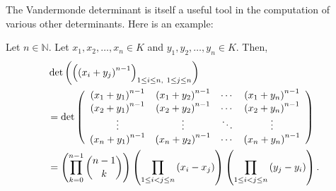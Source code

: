 The Vandermonde determinant is itself a useful tool in the computation of
various other determinants. Here is an example:

\begin{proposition}
\label{prop.det.(xi+yj)n-1}Let $n\in\mathbb{N}$. Let $x_{1},x_{2},\ldots
,x_{n}\in K$ and $y_{1},y_{2},\ldots,y_{n}\in K$. Then,%
\begin{align*}
&  \det\left(  \left(  \left(  x_{i}+y_{j}\right)  ^{n-1}\right)  _{1\leq
i\leq n,\ 1\leq j\leq n}\right) \\
&  =\det\left(
\begin{array}
[c]{cccc}%
\left(  x_{1}+y_{1}\right)  ^{n-1} & \left(  x_{1}+y_{2}\right)  ^{n-1} &
\cdots & \left(  x_{1}+y_{n}\right)  ^{n-1}\\
\left(  x_{2}+y_{1}\right)  ^{n-1} & \left(  x_{2}+y_{2}\right)  ^{n-1} &
\cdots & \left(  x_{2}+y_{n}\right)  ^{n-1}\\
\vdots & \vdots & \ddots & \vdots\\
\left(  x_{n}+y_{1}\right)  ^{n-1} & \left(  x_{n}+y_{2}\right)  ^{n-1} &
\cdots & \left(  x_{n}+y_{n}\right)  ^{n-1}%
\end{array}
\right) \\
&  =\left(  \prod_{k=0}^{n-1}\dbinom{n-1}{k}\right)  \left(  \prod_{1\leq
i<j\leq n}\left(  x_{i}-x_{j}\right)  \right)  \left(  \prod_{1\leq i<j\leq
n}\left(  y_{j}-y_{i}\right)  \right)  .
\end{align*}

\end{proposition}

